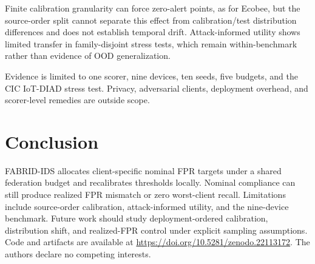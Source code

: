 \documentclass[pdflatex,sn-mathphys-num]{sn-jnl}
\begin{document}
Finite calibration granularity can force zero-alert points, as for Ecobee, but the source-order split cannot separate this effect from calibration/test distribution differences and does not establish temporal drift. Attack-informed utility shows limited transfer in family-disjoint stress tests, which remain within-benchmark rather than evidence of OOD generalization.

Evidence is limited to one scorer, nine devices, ten seeds, five budgets, and the CIC IoT-DIAD stress test. Privacy, adversarial clients, deployment overhead, and scorer-level remedies are outside scope.

\section{Conclusion}\label{sec:conclusion}
FABRID-IDS allocates client-specific nominal FPR targets under a shared federation budget and recalibrates thresholds locally. Nominal compliance can still produce realized FPR mismatch or zero worst-client recall. Limitations include source-order calibration, attack-informed utility, and the nine-device benchmark. Future work should study deployment-ordered calibration, distribution shift, and realized-FPR control under explicit sampling assumptions. Code and artifacts are available at \url{https://doi.org/10.5281/zenodo.22113172}. The authors declare no competing interests.


\end{document}
